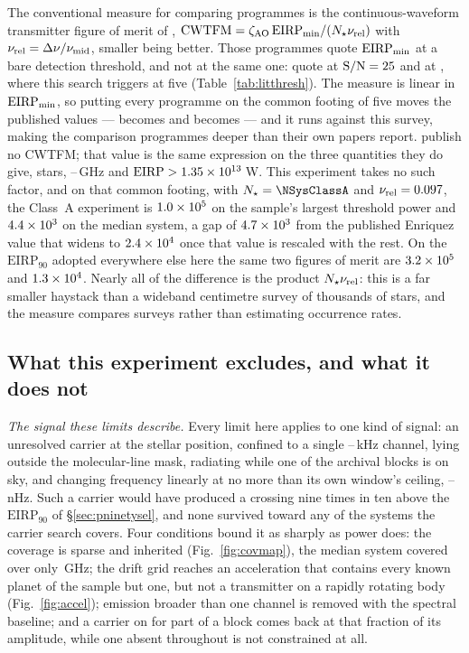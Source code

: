 The conventional measure for comparing programmes is the continuous-waveform
transmitter figure of merit of \citet{Enriquez2017},
$\mathrm{CWTFM}=\zeta_{\rm AO}\,\mathrm{EIRP}_{\rm min}/
(N_{\star}\nu_{\rm rel})$ with $\nu_{\rm rel}=\Delta\nu/\nu_{\rm mid}$,
smaller being better. Those programmes quote $\mathrm{EIRP}_{\rm min}$ at a
bare detection threshold, and not at the same one: \citet{Enriquez2017} quote
at $\mathrm{S/N}=25$ and \citet{Margot2023} at
\FomLitSnrMargot, where this search triggers at five
(Table~\ref{tab:litthresh}). The measure is linear in
$\mathrm{EIRP}_{\rm min}$, so putting every programme on the common footing
of five moves the published values --- \FomLitEnriquez{} becomes
\FomLitEnriquezFive{} and \FgLitMargot{} becomes \FgLitMargotFive{} --- and
it runs against this survey, making the comparison programmes deeper than
their own papers report. \citet{Margot2023} publish no CWTFM; that value is
the same expression on the three quantities they do give, \FomMargotN{}
stars, \FomMargotLo--\FomMargotHi\,GHz and
$\mathrm{EIRP}>1.35\times10^{13}$\,W. This experiment takes no such factor, and
on that common footing, with $N_{\star}=\NSysClassA$ and
$\nu_{\rm rel}=0.097$, the Class~A experiment is $1.0\times10^{5}$ on
the sample's largest threshold power and $4.4\times10^{3}$ on the median
system, a gap of $4.7\times10^{3}$ from the published Enriquez value that
widens to $2.4\times10^{4}$ once that value is rescaled with the rest.
On the $\mathrm{EIRP}_{90}$ adopted everywhere else here the same two
figures of merit are $3.2\times10^{5}$ and
$1.3\times10^{4}$. Nearly all of
the difference is the product $N_{\star}\nu_{\rm rel}$: this is a far smaller
haystack than a wideband centimetre survey of thousands of stars, and the
measure compares surveys rather than estimating occurrence rates.

\subsection{What this experiment excludes, and what it does not}
\label{sec:excludes}

\noindent\emph{The signal these limits describe.} Every limit here applies to
one kind of signal: an unresolved carrier at the stellar position, confined to
a single \ChanLoA--\ChanHiA\,kHz channel, lying outside the molecular-line
mask, radiating while one of the archival blocks is on sky, and changing
frequency linearly at no more than its own window's ceiling,
\DriftCeilLo--\DriftCeilHi\,nHz. Such a carrier would
have produced a crossing nine times in ten above the $\mathrm{EIRP}_{90}$ of
\S\ref{sec:pninetysel}, and none survived toward any of the \NSysClassA{}
systems the carrier search covers. Four conditions
bound it as sharply as power does: the coverage is sparse and
inherited (Fig.~\ref{fig:covmap}), the median system covered over only
\SysUnionAMed\,GHz; the drift grid reaches an acceleration that contains every
known planet of the sample but one, but not a transmitter on a rapidly
rotating body (Fig.~\ref{fig:accel}); emission broader than one channel is
removed with the spectral baseline; and a carrier on for part of a block comes
back at that fraction of its amplitude, while one absent throughout is not
constrained at all.

